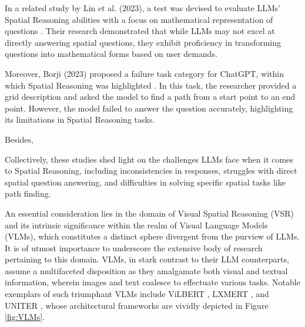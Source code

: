\documentclass[journal,10pt]{IEEEtran}
\begin{document}
In a related study by Lin et al. (2023), a test was devised to evaluate LLMs' Spatial Reasoning abilities with a focus on mathematical representation of questions \cite{lin2023using}. Their research demonstrated that while LLMs may not excel at directly answering spatial questions, they exhibit proficiency in transforming questions into mathematical forms based on user demands.

Moreover, Borji (2023) proposed a failure task category for ChatGPT, within which Spatial Reasoning was highlighted \cite{borji2023categorical}. In this task, the researcher provided a grid description and asked the model to find a path from a start point to an end point. However, the model failed to answer the question accurately, highlighting its limitations in Spatial Reasoning tasks.

Besides, 


Collectively, these studies shed light on the challenges LLMs face when it comes to Spatial Reasoning, including inconsistencies in responses, struggles with direct spatial question answering, and difficulties in solving specific spatial tasks like path finding. 

An essential consideration lies in the domain of Visual Spatial Reasoning (VSR) and its intrinsic significance within the realm of Visual Language Models (VLMs), which constitutes a distinct sphere divergent from the purview of LLMs. It is of utmost importance to underscore the extensive body of research pertaining to this domain. VLMs, in stark contrast to their LLM counterparts, assume a multifaceted disposition as they amalgamate both visual and textual information, wherein images and text coalesce to effectuate various tasks. Notable exemplars of such triumphant VLMs include ViLBERT \cite{li2019visualbert}, LXMERT \cite{tan2019lxmert}, and UNITER \cite{chen2020uniter}, whose architectural frameworks are vividly depicted in Figure \ref{fig:VLMs}.
\end{document}
